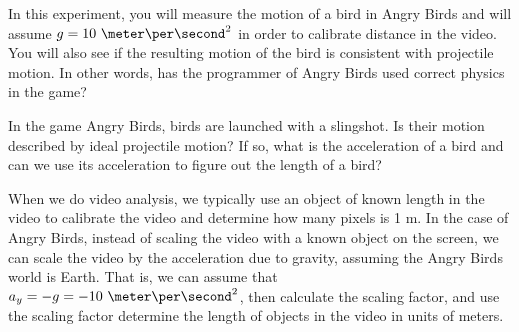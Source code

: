 
\apparatus


\longgoal

In this experiment, you will measure the motion of a bird in Angry Birds and will assume $g=10\ \meter\per\second^2$ in order to calibrate distance in the video. You will also see if the resulting motion of the bird is consistent with projectile motion. In other words, has the programmer of Angry Birds used correct physics in the game?

\introduction

In the game Angry Birds, birds are launched with a slingshot. Is their motion described by ideal projectile motion? If so, what is the acceleration of a bird and can we use its acceleration to figure out the length of a bird? 

When we do video analysis, we typically use an object of known length in the video to calibrate the video and determine how many pixels is 1 m. In the case of Angry Birds, instead of scaling the video with a known object on the screen, we can scale the video by the acceleration due to gravity, assuming the Angry Birds world is Earth. That is, we can assume that $a_y=-g=-10\ \meter\per\second^2$, then calculate the scaling factor, and use the scaling factor determine the length of objects in the video in units of meters.

\procedure

